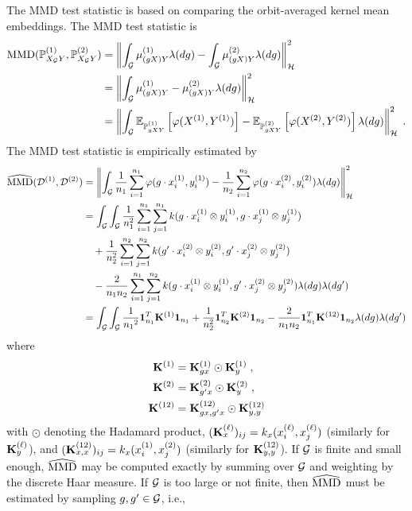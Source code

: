 \begin{itemize}
The MMD test statistic is based on comparing the orbit-averaged kernel mean embeddings. The MMD test statistic is
\begin{align*}
\mathrm{MMD}(\mathbb{P}_{X_{\mathcal{G}} Y}^{(1)},\mathbb{P}_{X_{\mathcal{G}} Y}^{(2)}) &= \left\|\int_{\mathcal{G}}\mu_{(gX)Y}^{(1)}\lambda(dg) - \int_{\mathcal{G}}\mu_{(gX)Y}^{(2)}\lambda(dg)\right\|_{\mathcal{H}}^2 \\
&= \left\|\int_{\mathcal{G}}\mu_{(gX)Y}^{(1)} - \mu_{(gX)Y}^{(2)}\lambda(dg)\right\|_{\mathcal{H}}^2 \\
&= \left\|\int_{\mathcal{G}}\mathbb{E}_{\mathbb{P}_{gXY}^{(1)}}\left[\varphi(X^{(1)},Y^{(1)})\right] - \mathbb{E}_{\mathbb{P}_{gXY}^{(2)}}\left[\varphi(X^{(2)},Y^{(2)})\right]\lambda(dg)\right\|_{\mathcal{H}}^2 \;.
\end{align*}
The MMD test statistic is empirically estimated by
\begin{align*}
\widehat{\mathrm{MMD}}(\mathcal{D}^{(1)},\mathcal{D}^{(2)}) &= \left\|\int_{\mathcal{G}}\frac{1}{n_1}\sum_{i=1}^{n_1}\varphi(g\cdot x^{(1)}_i,y^{(1)}_i) - \frac{1}{n_2}\sum_{i=1}^{n_2}\varphi(g\cdot x^{(2)}_i,y^{(2)}_i)\lambda(dg)\right\|_{\mathcal{H}}^2 \\
&= \int_{\mathcal{G}}\int_{\mathcal{G}} \frac{1}{n_1^2}\sum_{i=1}^{n_1}\sum_{j=1}^{n_1}k(g\cdot x^{(1)}_i\otimes y^{(1)}_i,g\cdot x^{(1)}_j\otimes y^{(1)}_j) \\
&\quad + \frac{1}{n_2^2}\sum_{i=1}^{n_2}\sum_{j=1}^{n_2}k(g'\cdot x^{(2)}_i\otimes y^{(2)}_i,g'\cdot x^{(2)}_j\otimes y^{(2)}_j) \\
&\quad - \frac{2}{n_1n_2}\sum_{i=1}^{n_1}\sum_{j=1}^{n_2}k(g\cdot x^{(1)}_i\otimes y^{(1)}_i,g'\cdot x^{(2)}_j\otimes y^{(2)}_j) \lambda(dg)\lambda(dg') \\
&= \int_{\mathcal{G}}\int_{\mathcal{G}} \frac{1}{{n_1}^2}\mathbf{1}_{n_1}^T\mathbf{K}^{(1)}\mathbf{1}_{n_1} + \frac{1}{n_2^2}\mathbf{1}_{n_2}^T\mathbf{K}^{(2)}\mathbf{1}_{n_2} - \frac{2}{n_1n_2}\mathbf{1}_{n_1}^T\mathbf{K}^{(12)}\mathbf{1}_{n_2} \lambda(dg)\lambda(dg')
\end{align*}
where
\begin{align*}
\mathbf{K}^{(1)} &= \mathbf{K}_{gx}^{(1)}\odot \mathbf{K}_y^{(1)} \;, \\
\mathbf{K}^{(2)} &= \mathbf{K}_{g'x}^{(2)}\odot \mathbf{K}_y^{(2)} \;, \\
\mathbf{K}^{(12)} &= \mathbf{K}_{gx,g'x}^{(12)}\odot \mathbf{K}_{y,y}^{(12)} \\
\end{align*}
with $\odot$ denoting the Hadamard product, $(\mathbf{K}_x^{(\ell)})_{ij}=k_x(x_i^{(\ell)},x_j^{(\ell)})$ (similarly for $\mathbf{K}_y^{(\ell)}$), and $(\mathbf{K}_{x,x}^{(12)})_{ij}=k_x(x_i^{(1)},x_j^{(2)})$ (similarly for $\mathbf{K}_{y,y}^{(12)}$). If $\mathcal{G}$ is finite and small enough, $\widehat{\mathrm{MMD}}$ may be computed exactly by summing over $\mathcal{G}$ and weighting by the discrete Haar measure. If $\mathcal{G}$ is too large or not finite, then $\widehat{\mathrm{MMD}}$ must be estimated by sampling $g,g'\in\mathcal{G}$, i.e.,

\end{itemize}
